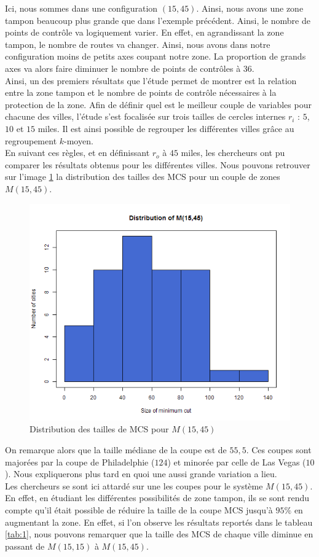 Ici, nous sommes dans une configuration $(15,45)$. Ainsi, nous avons une zone tampon beaucoup plus grande que dans l'exemple précédent. Ainsi, le nombre de points de contrôle va logiquement varier. En effet, en agrandissant la zone tampon, le nombre de routes va changer. Ainsi, nous avons dans notre configuration moins de petits axes coupant notre zone. La proportion de grands axes va alors faire diminuer le nombre de points de contrôles à 36.\\
Ainsi, un des premiers résultats que l'étude permet de montrer est la relation entre la zone tampon et le nombre de points de contrôle nécessaires à la protection de la zone. Afin de définir quel est le meilleur couple de variables pour chacune des villes, l'étude s'est focalisée sur trois tailles de cercles internes $r_i$ : $5$, $10$ et $15$ miles. Il est ainsi possible de regrouper les différentes villes grâce au regroupement $k$-moyen.\\
En suivant ces règles, et en définissant $r_o$ à $45$ miles, les chercheurs ont pu comparer les résultats obtenus pour les différentes villes. Nous pouvons retrouver sur l'image \ref{img:3} la distribution des tailles des MCS pour un couple de zones $M(15,45)$.
\begin{figure}[H]
 \centering
 \includegraphics[width=.7\textwidth]{img/histo.png}
 \caption{Distribution des tailles de MCS pour $M(15,45)$}
 \label{img:3}
\end{figure}
On remarque alors que la taille médiane de la coupe est de $55,5$. Ces coupes sont majorées par la coupe de Philadelphie ($124$) et minorée par celle de Las Vegas ($10$). Nous expliquerons plus tard en quoi une aussi grande variation a lieu.\\
Les chercheurs se sont ici attardé sur une les coupes pour le système $M(15,45)$. En effet, en étudiant les différentes possibilités de zone tampon, ils se sont rendu compte qu'il était possible de réduire la taille de la coupe MCS jusqu'à $95\%$ en augmentant la zone. En effet, si l'on observe les résultats reportés dans le tableau \ref{tab:1}, nous pouvons remarquer que la taille des MCS de chaque ville diminue en passant de $M(15,15)$ à $M(15,45)$.
